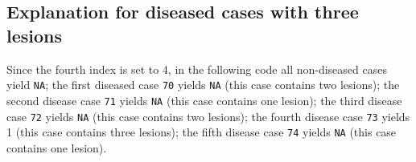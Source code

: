 \documentclass[
]{book}
\newenvironment{Shaded}{\begin{snugshade}}{\end{snugshade}}
\newcommand{\CommentTok}[1]{\textcolor[rgb]{0.56,0.35,0.01}{\textit{#1}}}
\newcommand{\DecValTok}[1]{\textcolor[rgb]{0.00,0.00,0.81}{#1}}
\newcommand{\FunctionTok}[1]{\textcolor[rgb]{0.00,0.00,0.00}{#1}}
\newcommand{\NormalTok}[1]{#1}
\newcommand{\SpecialCharTok}[1]{\textcolor[rgb]{0.00,0.00,0.00}{#1}}
\begin{document}
\hypertarget{explanation-for-diseased-cases-with-three-lesions}{%
\subsection{Explanation for diseased cases with three lesions}\label{explanation-for-diseased-cases-with-three-lesions}}

Since the fourth index is set to 4, in the following code all non-diseased cases yield \texttt{NA}; the first diseased case \texttt{70} yields \texttt{NA} (this case contains two lesions); the second disease case \texttt{71} yields \texttt{NA} (this case contains one lesion); the third disease case \texttt{72} yields \texttt{NA} (this case contains two lesions); the fourth disease case \texttt{73} yields 1 (this case contains three lesions); the fifth disease case \texttt{74} yields \texttt{NA} (this case contains one lesion).

\begin{Shaded}
\end{Shaded}
\end{document}
